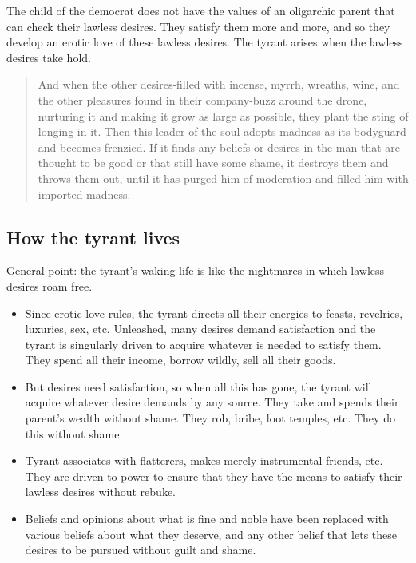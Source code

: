 \documentclass[oneside]{article}
\begin{document}
\noindent  The child of the democrat does not have the values of an oligarchic parent that can check their lawless desires. They satisfy them more and more, and so they develop an erotic love of these lawless desires. The tyrant arises when the lawless desires take hold.


\begin{quote}
And when the other desires-filled with incense, myrrh, wreaths, wine,
and the other pleasures found in their company-buzz around the drone,
nurturing it and making it grow as large as possible, they plant the
sting of longing in it. Then this leader of the soul adopts madness as
its bodyguard and becomes frenzied. If it finds any beliefs or desires
in the man that are thought to be good or that still have some shame, it
destroys them and throws them out, until it has purged him of moderation
and filled him with imported madness.
\end{quote}

\subsection*{How the tyrant lives}

General point: the tyrant's waking life is like the nightmares in which lawless desires roam free.

\begin{itemize}
\item
  Since erotic love rules, the tyrant directs all their energies to feasts, revelries, luxuries, sex, etc. Unleashed, many desires demand satisfaction and the tyrant is  singularly driven to acquire whatever is needed to satisfy them. They spend all their income, borrow wildly, sell all their goods.
\item But desires need satisfaction, so when all this has gone, the tyrant
  will acquire whatever desire demands by any source. They take and
  spends their parent's wealth without shame. They rob, bribe, loot
  temples, etc. They do this without shame.  
  \item Tyrant associates with flatterers, makes merely instrumental friends,
  etc. They are driven to power to ensure that they have the means to
  satisfy their lawless desires without rebuke.
  \item Beliefs and opinions about   what is fine and noble have been replaced with various beliefs about  what they deserve, and any other belief that lets these desires to be  pursued without guilt and shame.
 \end{itemize}
\end{document}
